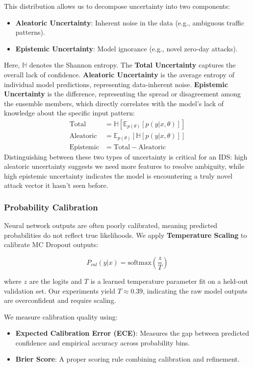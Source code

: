 \documentclass[conference]{IEEEtran}
\begin{document}
This distribution allows us to decompose uncertainty into two components:
\begin{itemize}
    \item \textbf{Aleatoric Uncertainty}: Inherent noise in the data (e.g., ambiguous traffic patterns).
    \item \textbf{Epistemic Uncertainty}: Model ignorance (e.g., novel zero-day attacks).
\end{itemize}

Here, $\mathbb{H}$ denotes the Shannon entropy. The \textbf{Total Uncertainty} captures the overall lack of confidence. \textbf{Aleatoric Uncertainty} is the average entropy of individual model predictions, representing data-inherent noise. \textbf{Epistemic Uncertainty} is the difference, representing the spread or disagreement among the ensemble members, which directly correlates with the model's lack of knowledge about the specific input pattern:
\begin{align}
\text{Total} &= \mathbb{H}[\mathbb{E}_{p(\theta)}[p(y|x,\theta)]] \\
\text{Aleatoric} &= \mathbb{E}_{p(\theta)}[\mathbb{H}[p(y|x,\theta)]] \\
\text{Epistemic} &= \text{Total} - \text{Aleatoric}
\end{align}
Distinguishing between these two types of uncertainty is critical for an IDS: high aleatoric uncertainty suggests we need more features to resolve ambiguity, while high epistemic uncertainty indicates the model is encountering a truly novel attack vector it hasn't seen before.

\subsubsection{Probability Calibration}
Neural network outputs are often poorly calibrated, meaning predicted probabilities do not reflect true likelihoods. We apply \textbf{Temperature Scaling} to calibrate MC Dropout outputs:

\begin{equation}
P_{cal}(y|x) = \text{softmax}\left(\frac{z}{T}\right)
\end{equation}

where $z$ are the logits and $T$ is a learned temperature parameter fit on a held-out validation set. Our experiments yield $T \approx 0.39$, indicating the raw model outputs are overconfident and require scaling.

We measure calibration quality using:
\begin{itemize}
    \item \textbf{Expected Calibration Error (ECE)}: Measures the gap between predicted confidence and empirical accuracy across probability bins.
    \item \textbf{Brier Score}: A proper scoring rule combining calibration and refinement.
\end{itemize}
\end{document}
